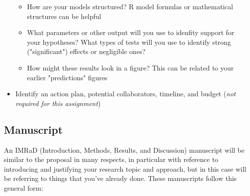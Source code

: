 \documentclass[11pt]{article}
\begin{document}
\begin{itemize}
\begin{itemize}
\begin{itemize}
    \end{itemize}
    \item How are your models structured? R model formulas or mathematical structures can be helpful
    \item What parameters or other output will you use to idenfity support for your hypotheses? What types of tests will you use to identify strong ("significant") effects or negligible ones?
    \item How might these results look in a figure? This can be related to your earlier "predictions" figures
  \end{itemize}
  \item Identify an action plan, potential collaborators, timeline, and budget (\emph{not required for this assignment})
\end{itemize}

\subsection*{Manuscript}

An IMRaD (Introduction, Methods, Results, and Discussion) manuscript will be similar to the proposal in many respects, in particular with reference to introducing and justifying your research topic and approach, but in this case will be referring to things that you've already done. These manuscripts follow this general form:
\end{document}
